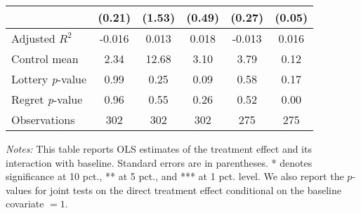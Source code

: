 \begin{table}[htbp]
{\begin{threeparttable}
\begin{tabular}{l*{5}{c}}
                &   (0.21)         &   (1.53)         &   (0.49)         &   (0.27)         &   (0.05)         \\
\midrule
Adjusted \(R^{2}\)&   -0.016         &    0.013         &    0.018         &   -0.013         &    0.016         \\
Control mean    &     2.34         &    12.68         &     3.10         &     3.79         &     0.12         \\
Lottery \emph{p}-value&     0.99         &     0.25         &     0.09         &     0.58         &     0.17         \\
Regret \emph{p}-value&     0.96         &     0.55         &     0.26         &     0.52         &     0.00         \\
Observations    &      302         &      302         &      302         &      275         &      275         \\
\bottomrule \end{tabular} \begin{tablenotes}[flushleft] \footnotesize \item \emph{Notes:} This table reports OLS estimates of the treatment effect and its interaction with baseline. Standard errors are in parentheses. * denotes significance at 10 pct., ** at 5 pct., and *** at 1 pct. level. We also report the \(p\)-values for joint tests on the direct treatment effect conditional on the baseline covariate $= 1$. \end{tablenotes} \end{threeparttable} } \end{table}
